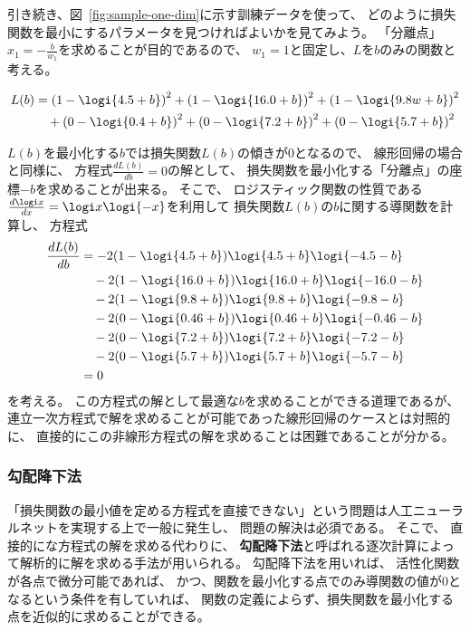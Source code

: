 \newpage
引き続き、図~\ref{fig:sample-one-dim}に示す訓練データを使って、
どのように損失関数を最小にするパラメータを見つければよいかを見てみよう。
「分離点」$x_1 = - \frac b{w_1}$を求めることが目的であるので、
$w_1 = 1$と固定し、$L$を$b$のみの関数と考える。

\begin{align*}
  L(b)
  &
  = \left(1 - \logi{4.5 + b}\right)^2 + \left(1 - \logi{16.0 + b}\right)^2 + \left(1 - \logi{9.8 w + b}\right)^2
  \\&\quad
  + \left(0 - \logi{0.4 + b}\right)^2 + \left(0 - \logi{7.2 + b}\right)^2 + \left(0 - \logi{5.7 + b}\right)^2
\end{align*}

$L(b)$を最小化する$b$では損失関数$L(b)$の傾きが0となるので、
線形回帰の場合と同様に、
方程式$\frac{dL(b)}{db} = 0$の解として、
損失関数を最小化する「分離点」の座標$-b$を求めることが出来る。
そこで、
ロジスティック関数の性質である$\frac{d\logi x}{dx} = \logi x\logi{-x}$を利用して
損失関数$L(b)$の$b$に関する導関数を計算し、
方程式
\begin{align*}
  \frac{dL(b)}{db}
  &
    =
    - 2(1 - \logi{4.5 + b})\logi{4.5 + b}\logi{-4.5 - b}
  \\&\quad
  - 2(1 - \logi{16.0 + b})\logi{16.0 + b}\logi{-16.0 - b}
  \\&\quad
    - 2(1 - \logi{9.8 + b})\logi{9.8 + b}\logi{-9.8 - b}
  \\&\quad
    - 2(0 - \logi{0.46 + b})\logi{0.46 + b}\logi{-0.46 - b}
  \\&\quad
    - 2(0 - \logi{7.2 + b})\logi{7.2 + b}\logi{-7.2 - b}
  \\&\quad
  - 2(0 - \logi{5.7 + b})\logi{5.7 + b}\logi{-5.7 - b}
  \\&
  = 0
\end{align*}
を考える。
この方程式の解として最適な$b$を求めることができる道理であるが、
連立一次方程式で解を求めることが可能であった線形回帰のケースとは対照的に、
直接的にこの非線形方程式の解を求めることは困難であることが分かる。

\subsubsection{勾配降下法}
\label{sec:gradient-descent}

「損失関数の最小値を定める方程式を直接できない」という問題は人工ニューラルネットを実現する上で一般に発生し、
問題の解決は必須である。
そこで、
直接的にな方程式の解を求める代わりに、
\textbf{勾配降下法}と呼ばれる逐次計算によって解析的に解を求める手法が用いられる。
勾配降下法を用いれば、
活性化関数が各点で微分可能であれば、
かつ、関数を最小化する点でのみ導関数の値が0となるという条件を有していれば、
関数の定義によらず、損失関数を最小化する点を近似的に求めることができる。

